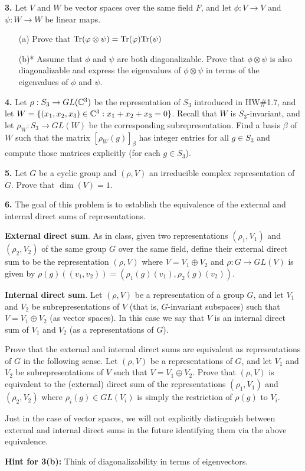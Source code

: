 \documentclass[12pt]{amsart}
\begin{document}
\skv
{\bf 3.} Let $V$ and $W$ be vector spaces over the same field $F$, and let $\phi:V\to V$ and $\psi: W\to W$ be linear maps.
\begin{itemize}
\item[(a)] Prove that ${\rm Tr}({\varphi}\otimes \psi)={\rm Tr}({\varphi}) {\rm Tr}(\psi)$
\item[(b)*] Assume that $\phi$ and $\psi$ are both diagonalizable. Prove that $\phi\otimes \psi$ is also diagonalizable and express the eigenvalues of $\phi\otimes \psi$ in terms of the eigenvalues of $\phi$ and $\psi$.
\end{itemize}

\skv
{\bf 4.} Let $\rho:S_3\to GL({\mathbb C}^3)$ be the representation of $S_3$ introduced in HW\#1.7, and let $W=\{(x_1,x_2,x_3)\in{\mathbb C}^3: x_1+x_2+x_3=0\}$. Recall that $W$ is $S_3$-invariant, and let $\rho_W: S_3\to GL(W)$ be the corresponding subrepresentation. Find a basis 
$\beta$ of $W$ such that the matrix $[\rho_W(g)]_{\beta}$ has integer entries for all $g\in S_3$ and compute those matrices explicitly (for each $g\in S_3$).

\skv
{\bf 5.} Let $G$ be a cyclic group and $(\rho,V)$ an irreducible complex representation of $G$. Prove that $\dim(V)=1$.

\skv
{\bf 6.} The goal of this problem is to establish the equivalence of the external and internal direct sums of representations.

{\bf External direct sum}. As in class, given two representations $(\rho_1,V_1)$ and $(\rho_2,V_2)$ of the same group $G$ over the same field, define their external direct sum to be the representation $(\rho,V)$ where $V=V_1\oplus V_2$ and $\rho:G\to GL(V)$ is given by
$\rho(g)((v_1,v_2))=(\rho_1(g)(v_1),\rho_2(g)(v_2))$.

{\bf Internal direct sum}. Let $(\rho,V)$ be a representation of a group $G$, and let $V_1$ and $V_2$ be subrepresentations of $V$ (that is,
$G$-invariant subspaces) such that $V=V_1\oplus V_2$ (as vector spaces). In this case we say that $V$ is an internal direct sum of $V_1$
and $V_2$ (as a representations of $G$).

\sk Prove that the external and internal direct sums are equivalent as representations of $G$ in the following sense. Let $(\rho,V)$ be a representations of $G$, and let $V_1$ and $V_2$ be subrepresentations of $V$ such that $V=V_1\oplus V_2$. Prove that $(\rho,V)$ is equivalent to the (external) direct sum of the representations $(\rho_1,V_1)$ and $(\rho_2,V_2)$ where $\rho_i(g)\in GL(V_i)$ is 
simply the restriction of $\rho(g)$ to $V_i$.

\sk Just in the case of vector spaces, we will not explicitly distinguish between external and internal direct sums in the future identifying them via the above equivalence.

\newpage
{\bf Hint for 3(b):} Think of diagonalizability in terms of eigenvectors.
\end{document}
